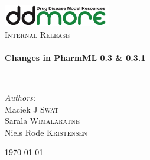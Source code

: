 \begin{titlepage}
\begin{center}

\includegraphics[width=0.35\textwidth]{./logo/ddmore_logo}~\\[1cm]

%
\textsc{\Large Internal Release}\\[0.5cm]

\HRule \\[0.4cm]
{ \huge \bfseries Changes in PharmML 0.3 \& 0.3.1 \\[0.4cm] }

\HRule \\[1.5cm]

\begin{minipage}{0.5\textwidth}
\begin{flushleft} \large
\emph{Authors:}\\
Maciek J \textsc{Swat}\\
Sarala \textsc{Wimalaratne}\\
Niels Rode \textsc{Kristensen}
\end{flushleft}
\end{minipage}
\begin{minipage}{0.4\textwidth}
\end{minipage}

\vfill

{\large \today}

\end{center}
\end{titlepage}